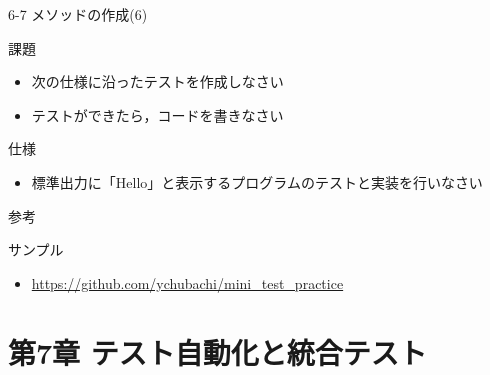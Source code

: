 \documentclass[t, aspectratio=169]{beamer}
\begin{document}
\begin{frame}[label=sec-6-4-7]{6-7 メソッドの作成(6)}
\begin{block}{課題}
\begin{itemize}
\item 次の仕様に沿ったテストを作成しなさい
\item テストができたら，コードを書きなさい
\end{itemize}
\end{block}
\begin{block}{仕様}
\begin{itemize}
\item 標準出力に「Hello」と表示するプログラムのテストと実装を行いなさい
\end{itemize}
\end{block}
\end{frame}

\begin{frame}[label=sec-6-4-8]{参考}
\begin{block}{サンプル}
\begin{itemize}
\item \url{https://github.com/ychubachi/mini_test_practice}
\end{itemize}
\end{block}
\end{frame}

\part{第7章 テスト自動化と統合テスト}
\label{sec-7}
\end{document}
